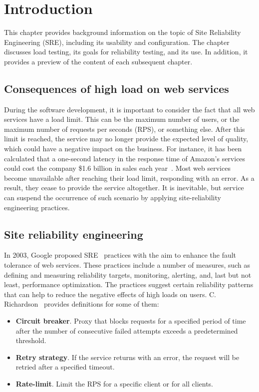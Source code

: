 \chapter{Introduction}
\label{ch:intro}

This chapter provides background information on the topic of Site Reliability Engineering (SRE), including its usability and configuration. The chapter discusses load testing, its goals for reliability testing, and its use. In addition, it provides a preview of the content of each subsequent chapter.


\section{Consequences of high load on web services}\label{sec:consequences-of-high-load-on-web-services}
During the software development, it is important to consider the fact that all web services have a load limit. This can be the maximum number of users, or the maximum number of requests per seconds (RPS), or something else. After this limit is reached, the service may no longer provide the expected level of quality, which could have a negative impact on the business. For instance, it has been calculated that a one-second latency in the response time of Amazon's services could cost the company \$1.6 billion in sales each year~\cite{one_second_article}.
Most web services become unavailable after reaching their load limit, responding with an error. As a result, they cease to provide the service altogether. It is inevitable, but service can suspend the occurrence of such scenario by applying site-reliability engineering practices.



\section{Site reliability engineering}\label{sec:site-reliability-engineering}
In 2003, Google proposed SRE~\cite{google_sre} practices with the aim to enhance the fault tolerance of web services. These practices include a number of measures, such as defining and measuring reliability targets, monitoring, alerting, and, last but not least, performance optimization. The practices suggest certain reliability patterns that can help to reduce the negative effects of high loads on users.
C. Richardson~\cite{microservices} provides definitions for some of them:
\begin{itemize}
    \item \textbf{Circuit breaker}. Proxy that blocks requests for a specified period of time after the number of consecutive failed attempts exceeds a predetermined threshold.
    \item \textbf{Retry strategy}. If the service returns with an error, the request will be retried after a specified timeout.
    \item \textbf{Rate-limit}. Limit the RPS for a specific client or for all clients.
\end{itemize}

